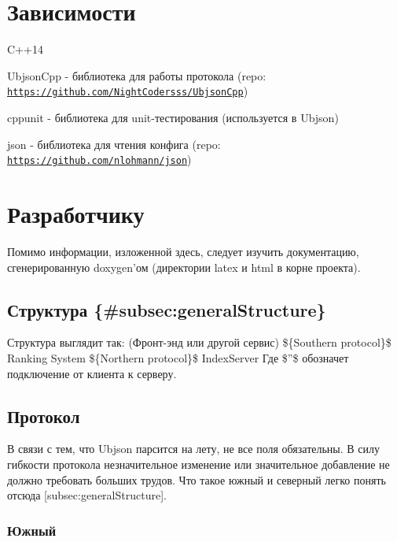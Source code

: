 \section*{Зависимости }


\begin{DoxyItemize}
\item C++14
\item Ubjson\-Cpp -\/ библиотека для работы протокола (repo\-: \href{https://github.com/NightCodersss/UbjsonCpp}{\tt https\-://github.\-com/\-Night\-Codersss/\-Ubjson\-Cpp})
\item cppunit -\/ библиотека для unit-\/тестирования (используется в Ubjson)
\item json -\/ библиотека для чтения конфига (repo\-: \href{https://github.com/nlohmann/json}{\tt https\-://github.\-com/nlohmann/json})
\end{DoxyItemize}

\section*{Разработчику }

Помимо информации, изложенной здесь, следует изучить документацию, сгенерированную doxygen’ом (директории latex и html в корне проекта).

\subsection*{Структура \{\#subsec\-:general\-Structure\} }

Структура выглядит так\-: (Фронт-\/энд или другой сервис) \$\{Southern protocol\}\$ Ranking System \$\{Northern protocol\}\$ Index\-Server Где \$''\$ обозначет подключение от клиента к серверу.

\subsection*{Протокол }

В связи с тем, что Ubjson парсится на лету, не все поля обязательны. В силу гибкости протокола незначительное изменение или значительное добавление не должно требовать больших трудов. Что такое южный и северный легко понять отсюда \mbox{[}subsec\-:general\-Structure\mbox{]}.

\subsubsection*{Южный}

